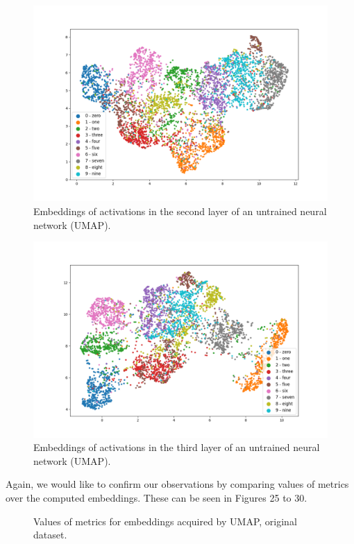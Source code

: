 \documentclass{article}
\begin{document}
\begin{figure}
  \centering
    \includegraphics[width=1.0\textwidth]{../../out/activations_cnn/mnist/umap/untrained/plot_l2_f0.png}
    \caption{Embeddings of activations in the second layer of an untrained neural network (UMAP).}
\end{figure}

\begin{figure}
  \centering
    \includegraphics[width=1.0\textwidth]{../../out/activations_cnn/mnist/umap/untrained/plot_l3.png}
    \caption{Embeddings of activations in the third layer of an untrained neural network (UMAP).}
\end{figure}

Again, we would like to confirm our observations by comparing values of
metrics over the computed embeddings. These can be seen in Figures 25 to
30.

\begin{figure}
  \centering
    \resizebox{\textwidth}{!}{
        
    }
  \caption{Values of metrics for embeddings acquired by UMAP, original dataset.}
\end{figure}
\end{document}
